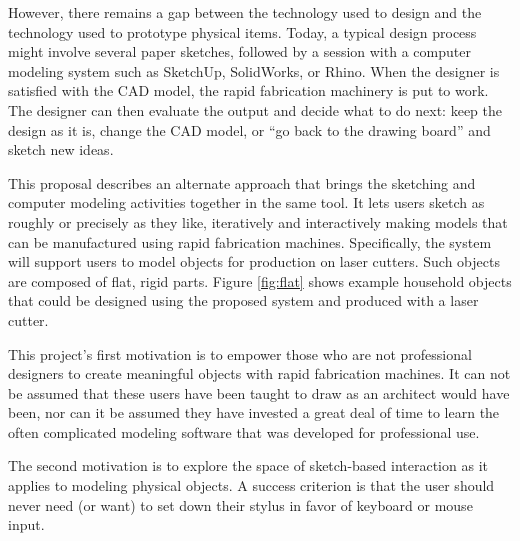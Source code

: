 \documentclass[12pt]{article}
\begin{document}
However, there remains a gap between the technology used to design and
the technology used to prototype physical items. Today, a typical
design process might involve several paper sketches, followed by a
session with a computer modeling system such as SketchUp, SolidWorks,
or Rhino. When the designer is satisfied with the CAD model, the rapid
fabrication machinery is put to work. The designer can then evaluate
the output and decide what to do next: keep the design as it is,
change the CAD model, or ``go back to the drawing board'' and sketch
new ideas.

This proposal describes an alternate approach that brings the
sketching and computer modeling activities together in the same
tool. It lets users sketch as roughly or precisely as they like,
iteratively and interactively making models that can be manufactured
using rapid fabrication machines. Specifically, the system will
support users to model objects for production on laser cutters. Such
objects are composed of flat, rigid parts. Figure \ref{fig:flat} shows
example household objects that could be designed using the proposed
system and produced with a laser cutter.

This project's first motivation is to empower those who are not
professional designers to create meaningful objects with rapid
fabrication machines. It can not be assumed that these users have been
taught to draw as an architect would have been, nor can it be assumed
they have invested a great deal of time to learn the often complicated
modeling software that was developed for professional use. 

The second motivation is to explore the space of sketch-based
interaction as it applies to modeling physical objects. A success
criterion is that the user should never need (or want) to set down
their stylus in favor of keyboard or mouse input.
\end{document}
